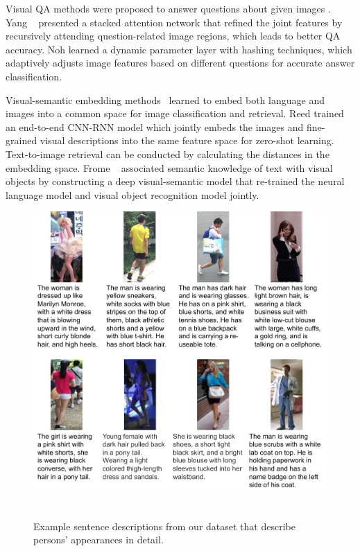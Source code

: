Visual QA methods were proposed to answer questions about given images
\cite{ren2015exploring,noh2015image,yang2015stacked,saito2016dualnet,malinowski2015ask,fukui2016multimodal}. Yang \etal~\cite{yang2015stacked} presented a stacked attention network that refined the joint features by recursively attending question-related image regions, which leads to better QA accuracy. Noh \etal \cite{noh2015image} learned a dynamic parameter layer with hashing techniques, which adaptively adjusts image features based on different questions for accurate answer classification.

Visual-semantic embedding methods~\cite{frome2013devise,karpathy2015deep,reed2016learning,liu2015multi,ren2015image} learned to embed both language and images into a common space for image classification and retrieval.
Reed \etal \cite{reed2016learning} trained an end-to-end CNN-RNN model which jointly embeds the images and fine-grained visual descriptions into the same feature space for zero-shot learning. Text-to-image retrieval can be conducted by calculating the distances in the embedding space. Frome \etal~\cite{frome2013devise} associated semantic knowledge of text with visual objects by constructing a deep visual-semantic model that re-trained the neural language model and visual object recognition model jointly.


\begin{figure}
\begin{center}
\includegraphics[width=1\linewidth]{figures/person_nlp/dataset.pdf} \ \\
\end{center}
\vspace{-8pt}
\caption{Example sentence descriptions from our dataset that describe persons' appearances in detail.}
\label{fig:dataset}
\vspace{-5pt}
\end{figure}


